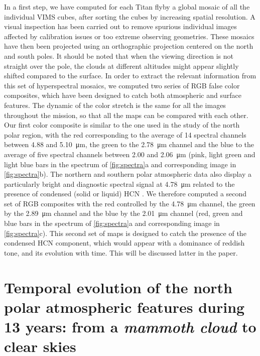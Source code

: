 \documentclass[preprint,twocolumn,5p,authoryear,compress,colorlinks=true]{elsarticle}
\newcommand{\figref}[1]{\autoref{fig:#1}}
\begin{document}
\clearpage

In a first step, we have computed for each Titan flyby a global mosaic of all the individual VIMS cubes, after sorting the cubes by increasing spatial resolution. A visual inspection has been carried out to remove spurious individual images affected by calibration issues or too extreme observing geometries. These mosaics have then been projected using an orthographic projection centered on the north and south poles.
It should be noted that when the viewing direction is not straight over the pole, the clouds at different altitudes might appear slightly shifted compared to the surface. In order to extract the relevant information from this set of hyperspectral mosaics, we computed two series of RGB false color composites, which have been designed to catch both atmospheric and surface features.
The dynamic of the color stretch is the same for all the images throughout the mission, so that all the maps can be compared with each other. Our first color composite is similar to the one used in the \cite{LeMouelic2012} study of the north polar region, with the red corresponding to the average of 14 spectral channels between \num{4.88} and \SI{5.10}{\um}, the green to the \SI{2.78}{\um} channel and the blue to the average of five spectral channels between \num{2.00} and \SI{2.06}{\um} (pink, light green and light blue bars in the spectrum of \figref{spectra}a and corresponding image in \figref{spectra}b). The northern and southern polar atmospheric data also display a particularly bright and diagnostic spectral signal at \SI{4.78}{\um} related to the presence of condensed (solid or liquid) HCN \citep{Clark2010,deKok2014}.
We therefore computed a second set of RGB composites with the red controlled by the \SI{4.78}{\um} channel, the green by the \SI{2.89}{\um} channel and the blue by the \SI{2.01}{\um} channel (red, green and blue bars in the spectrum of \figref{spectra}a and corresponding image in \figref{spectra}c). This second set of maps is designed to catch the presence of the condensed HCN component, which would appear with a dominance of reddish tone, and its evolution with time. This will be discussed latter in the paper.

\section{Temporal evolution of the north polar atmospheric features during 13 years: from a \emph{mammoth cloud} to clear skies}
\end{document}
